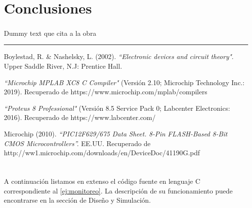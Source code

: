 \documentclass[a4paper]{article}
\let\originalcite\cite
\renewcommand{\cite}[2][]{\textsuperscript{\originalcite{#2}}}
\let\originalappendix\appendix
\renewcommand{\appendix}{%
    \newpage\originalappendix\pagenumbering{gobble}%
    \renewcommand\thesection{Anexo \Alph{section}}
    \setcounter{secnumdepth}{1}
}
\newenvironment{ejercicios}
    {\setcounter{secnumdepth}{3}
    \renewcommand\thesubsection{Ejercicio \arabic{subsection}}}
    {\setcounter{secnumdepth}{0}}
\begin{document}
\begin{ejercicios}
\end{ejercicios}

\section{Conclusiones}
Dummy text que cita a la obra \cite{bib:boylestad}

\noindent\rule{\textwidth}{1pt}

\begin{thebibliography}{9}

Boylestad, R. \& Nashelsky, L. (2002). 
\textit{``Electronic devices and circuit theory"}.
Upper Saddle River, N.J: Prentice Hall.

\textit{``Microchip MPLAB XC8 C Compiler"}
(Versión 2.10; Microchip Technology Inc.: 2019).
Recuperado de https://www.microchip.com/mplab/compilers

\textit{``Proteus 8 Professional"} 
(Versión 8.5 Service Pack 0; Labcenter Electronics: 2016).
Recuperado de https://www.labcenter.com/

Microchip (2010).
\textit{``PIC12F629/675 Data Sheet. 8-Pin FLASH-Based 8-Bit CMOS 
Microcontrollers''.}
EE.UU. Recuperado de 
http://ww1.microchip.com/downloads/en/DeviceDoc/41190G.pdf
\end{thebibliography}

\appendix

\section{}\label{ane:monitoreo}
A continuación listamos en extenso el código fuente en lenguaje C
correspondiente al \ref{ej:monitoreo}. La descripción de su 
funcionamiento puede encontrarse en la sección de Diseño y 
Simulación.



\newpage
\section{}
\end{document}
